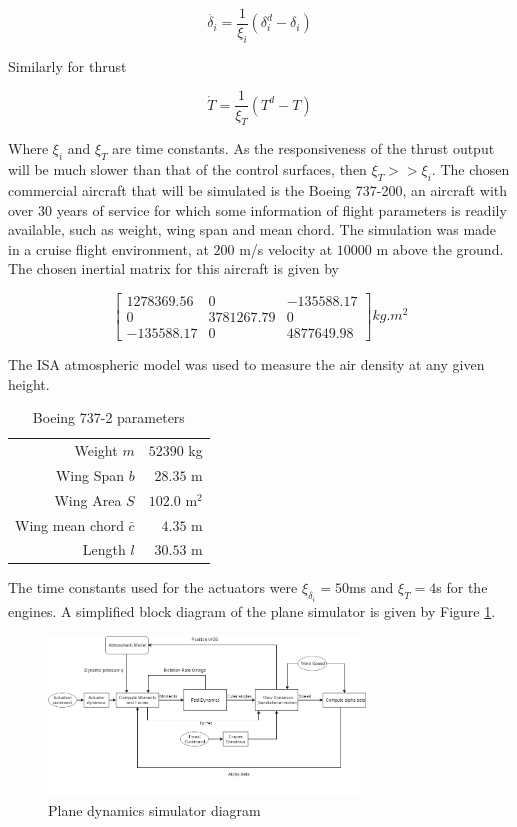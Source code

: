 \begin{equation}
\dot{\delta_i} = \dfrac{1}{\xi_i}(\delta_i^d-\delta_i)
\label{eq:actuator_dynamics}
\end{equation}

Similarly for thrust

\begin{equation}
\dot{T} = \dfrac{1}{\xi_T}(T^d-T)
\end{equation}

Where $\xi_i$ and $\xi_T$ are time constants. As the responsiveness of the thrust output will be much slower than that of the control surfaces, then $\xi_T>>\xi_i$.
The chosen commercial aircraft that will be simulated is the Boeing 737-200, an aircraft with over 30 years of service for which some information of flight parameters is readily available, such as weight, wing span and mean chord. The simulation was made in a cruise flight environment, at $200$ m/s velocity at $10000$ m above the ground. The chosen inertial matrix for this aircraft is given by

\begin{equation}
\begin{bmatrix}
1278369.56 & 0 & -135588.17\\
0 & 3781267.79 & 0\\
-135588.17 & 0 & 4877649.98
\end{bmatrix}
kg.m^2
\end{equation}

The ISA atmospheric model was used to measure the air density at any given height.
\begin{table}[htbp]
  \centering
  \caption{Boeing 737-2 parameters}
    \begin{tabular}{rr}
    \toprule
    Weight $m$ & $52390$ kg \\
    Wing Span $b$ & $28.35$ m \\
    Wing Area $S$ & $102.0$ m$^{2}$ \\
    Wing mean chord $\bar{c}$ & $4.35$ m \\
    Length $l$ & $30.53$ m \\
    \bottomrule
    \end{tabular}%
  \label{tab:b737_parameters}
\end{table}%
The time constants used for the actuators were $\xi_{\delta_i}=50$ms and $\xi_T=4$s for the engines. A simplified block diagram of the plane simulator is given by Figure \ref{fig:plane_model}.
\begin{figure}[h]
  \centering
  \includegraphics[width=0.75\textwidth]{../Figures/PlaneModel.png}
  \caption[Plane dynamics simulator diagram]{Plane dynamics simulator diagram}
  \label{fig:plane_model}
\end{figure}
